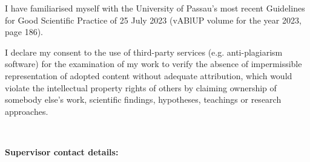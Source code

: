 I have familiarised myself with the University of Passau’s most recent Guidelines for Good Scientific Practice of 25 July 2023 (vABlUP volume for the year 2023, page 186).

I declare my consent to the use of third-party services (e.g. anti-plagiarism software) for the examination of my work to verify the absence of impermissible representation of adopted content without adequate attribution, which would violate the intellectual property rights of others by claiming ownership of somebody else’s work, scientific findings, hypotheses, teachings or research approaches.

\cleardoublepage
~
\vfill


\textbf{Supervisor contact details:} \smallskip \\ %
\contactprofone\\

\cleardoublepage
